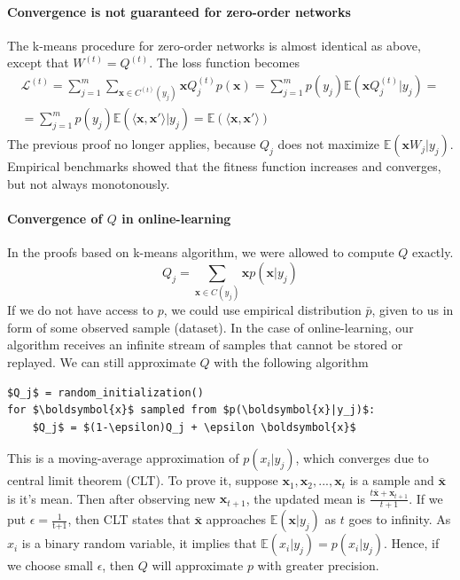 \documentclass[12pt]{article}
\begin{document}
\paragraph{Convergence is not guaranteed for zero-order networks}
The k-means procedure for zero-order networks is almost identical as above, except that $W^{(t)}=Q^{(t)}$. The loss function becomes
\begin{gather*}
\mathcal{L}^{(t)} = \sum_{j=1}^m \sum_{\boldsymbol{x}\in C^{(t)}(y_j)} \boldsymbol{x} Q_j^{(t)} p(\boldsymbol{x}) = \sum_{j=1}^m p(y_j) \mathbb{E}(\boldsymbol{x} Q_j^{(t)}|y_j) = \\ 
= \sum_{j=1}^m p(y_j) \mathbb{E}(\langle \boldsymbol{x},\boldsymbol{x}' \rangle |y_j) 	 = \mathbb{E}(\langle \boldsymbol{x},\boldsymbol{x}' \rangle)
\end{gather*}
The previous proof no longer applies, because $Q_j$ does not maximize $\mathbb{E}(\boldsymbol{x}W_j|y_j)$. Empirical benchmarks showed that the fitness function increases and converges, but not always monotonously. 

\paragraph{Convergence of $Q$ in online-learning}
In the proofs based on k-means algorithm, we were allowed to compute $Q$ exactly. 
\[
Q_j = \sum_{\boldsymbol{x}\in C(y_j)}\boldsymbol{x}p(\boldsymbol{x}|y_j)
\]
If we do not have access to $p$, we could use empirical distribution $\bar{p}$, given to us in form of some observed sample (dataset). In the case of online-learning, our algorithm receives an infinite stream of samples that cannot be stored or replayed. We can still approximate $Q$ with the following algorithm
\begin{lstlisting}
$Q_j$ = random_initialization()
for $\boldsymbol{x}$ sampled from $p(\boldsymbol{x}|y_j)$:
    $Q_j$ = $(1-\epsilon)Q_j + \epsilon \boldsymbol{x}$ 
\end{lstlisting}
This is a moving-average approximation of $p(x_i|y_j)$, which converges due to central limit theorem (CLT). To prove it, suppose $\boldsymbol{x}_1,\boldsymbol{x}_2,...,\boldsymbol{x}_t$ is a sample and $\bar{\boldsymbol{x}}$ is it's mean. Then after observing new $\boldsymbol{x}_{t+1}$, the updated mean is $\frac{t\bar{\boldsymbol{x}} + \boldsymbol{x}_{t+1} }{t+1}$. If we put $\epsilon=\frac{1}{\text{t+1}}$, then CLT states that $\bar{\boldsymbol{x}}$ approaches $\mathbb{E}(\boldsymbol{x}|y_j)$ as $t$ goes to infinity. As $x_i$ is a binary random variable, it implies that $\mathbb{E}(x_i|y_j)=p(x_i|y_j)$. Hence, if we choose small $\epsilon$, then $Q$ will approximate $p$ with greater precision.
\end{document}
